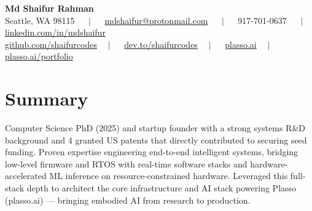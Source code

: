 \documentclass[10.5pt,letterpaper]{article}
\newcommand{\pipe}{$\quad \mid \quad$}
\begin{document}
\begin{center}
  {\LARGE\bfseries Md Shaifur Rahman}\\[4pt]
  Seattle, WA 98115 \pipe{} 
  \href{mailto:mdshaifur@protonmail.com}{mdshaifur@protonmail.com} \pipe{}
  917-701-0637 \pipe{} \href{https://linkedin.com/in/mdshaifur}{linkedin.com/in/mdshaifur}\\[2pt]
  \href{https://github.com/shaifurcodes}{github.com/shaifurcodes}\pipe{} 
  \href{https://dev.to/shaifurcodes}{dev.to/shaifurcodes}\pipe{} 
  \href{https://plasso.ai}{plasso.ai}\pipe{} 
  \href{https://plasso.ai/portfolio}{plasso.ai/portfolio}
\end{center}

\vspace{2pt}

\section*{Summary}
Computer Science PhD (2025) and startup founder with a strong systems R\&D background and 4 granted US patents that directly contributed to securing seed funding. Proven expertise engineering end-to-end intelligent systems, bridging low-level firmware and RTOS with real-time software stacks and hardware-accelerated ML inference on resource-constrained hardware. Leveraged this full-stack depth to architect the core infrastructure and AI stack powering Plasso (plasso.ai) --- bringing embodied AI from research to production.

\end{document}
